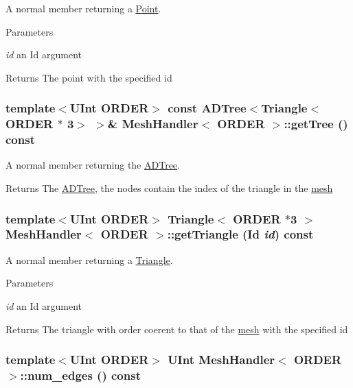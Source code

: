 A normal member returning a \hyperlink{classPoint}{Point}. 
\begin{DoxyParams}{Parameters}
\item[{\em id}]an Id argument \end{DoxyParams}
\begin{DoxyReturn}{Returns}
The point with the specified id 
\end{DoxyReturn}
\hypertarget{classMeshHandler_abdd94b51080aa42f94b22bc1b472c072}{
\subsubsection[{getTree}]{\setlength{\rightskip}{0pt plus 5cm}template$<$UInt ORDER$>$ const {\bf ADTree}$<${\bf Triangle}$<$ORDER $\ast$ 3$>$ $>$\& {\bf MeshHandler}$<$ ORDER $>$::getTree () const}}
\label{classMeshHandler_abdd94b51080aa42f94b22bc1b472c072}


A normal member returning the \hyperlink{classADTree}{ADTree}. \begin{DoxyReturn}{Returns}
The \hyperlink{classADTree}{ADTree}, the nodes contain the index of the triangle in the \hyperlink{structmesh}{mesh} 
\end{DoxyReturn}
\hypertarget{classMeshHandler_affac7f7128b883d6a0a6cdd19c1bd9bd}{
\subsubsection[{getTriangle}]{\setlength{\rightskip}{0pt plus 5cm}template$<$UInt ORDER$>$ {\bf Triangle}$<$ ORDER $\ast$3 $>$ {\bf MeshHandler}$<$ ORDER $>$::getTriangle (Id {\em id}) const}}
\label{classMeshHandler_affac7f7128b883d6a0a6cdd19c1bd9bd}


A normal member returning a \hyperlink{classTriangle}{Triangle}. 
\begin{DoxyParams}{Parameters}
\item[{\em id}]an Id argument \end{DoxyParams}
\begin{DoxyReturn}{Returns}
The triangle with order coerent to that of the \hyperlink{structmesh}{mesh} with the specified id 
\end{DoxyReturn}
\hypertarget{classMeshHandler_a545391eb9397b594ecbe0adae69a6887}{
\subsubsection[{num\_\-edges}]{\setlength{\rightskip}{0pt plus 5cm}template$<$UInt ORDER$>$ UInt {\bf MeshHandler}$<$ ORDER $>$::num\_\-edges () const}}
\label{classMeshHandler_a545391eb9397b594ecbe0adae69a6887}


